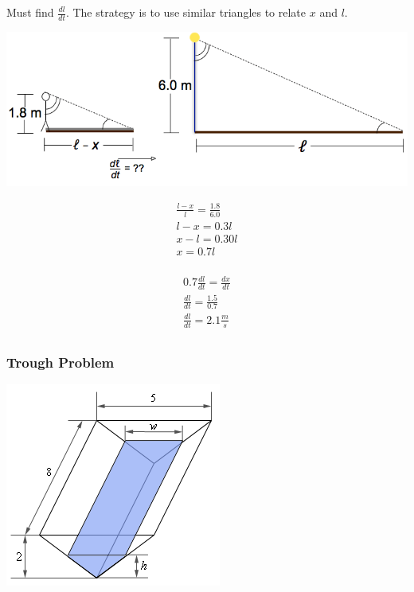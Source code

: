 \vspace{5mm} 

Must find $\frac{dl}{dt}$. 
The strategy is to use similar triangles to relate $x$ and $l$.

\begin{center}
    \includegraphics[scale=0.5]{figures/rr_shadow_str.png}
\end{center}

\begin{gather*}
    \frac{l-x}{l}=\frac{1.8}{6.0}\\
    l-x=0.3l\\
    x-l=0.30l\\
    x=0.7l\\
\end{gather*}

\vspace{5mm}

\begin{gather*}
    0.7\frac{dl}{dt}=\frac{dx}{dt}\\
    \frac{dl}{dt}=\frac{1.5}{0.7}\\
    \frac{dl}{dt}=2.1 \frac{m}{s}\\
\end{gather*}

\subsubsection{Trough Problem}

\begin{center}
    \includegraphics[scale=.5]{figures/rr_trough.png}
\end{center}

